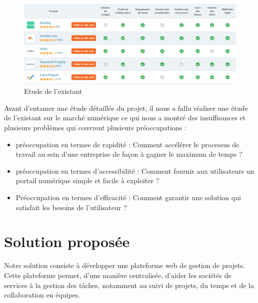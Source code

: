 \begin{figure}[h]
		\centering
		\includegraphics[scale=0.45]{figures/333ANIS3.png}
		\caption{Etude de l’existant}
		\label{fig:etudex}
\end{figure}\par Avant d’entamer une étude détaillée du projet, il nous a fallu réaliser une étude de l’existant sur le marché numérique ce qui nous a montré des insuffisances et plusieurs problèmes qui couvrent plusieurs préoccupations :
\begin{itemize}
    \item préoccupation en termes de rapidité : Comment accélérer le processus de travail au sein d’une entreprise de façon à gagner le maximum de temps ?
    \item préoccupation en termes d’accessibilité : Comment fournir aux utilisateurs un portail numérique simple et facile à exploiter ?
    \item Préoccupation en termes d’efficacité : Comment garantir une solution qui satisfait les besoins de l’utilisateur ?
\end{itemize}
\section{Solution proposée}

\hspace{4mm}    Notre solution consiste à développer une plateforme web de gestion de projets. Cette plateforme permet, d’une manière centralisée, d’aider les sociétés de services à la gestion des tâches, notamment au suivi de projets, du temps et de la collaboration en équipes. 

